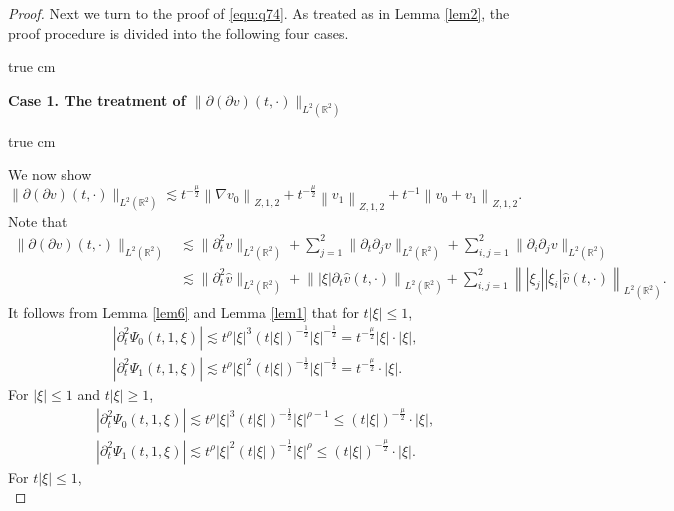 \documentclass[10pt,a4paper]{amsart}
\newcommand{\R}{\mathbb R}
\newcommand{\f}{\frac}
\newcommand{\p}{\partial}
\begin{document}
\begin{proof}
Next we turn to the proof of \eqref{equ:q74}. As treated as in  Lemma \ref{lem2}, the proof
procedure is divided into the following four cases.

 true cm

{\bf Case 1.  The treatment  of $\|\p(\p v)(t, \cdot)\|_{L^2(\R^2)}$ }

 true cm

We now show
\begin{equation}\label{equ:q78}
\|\p(\p v)(t, \cdot)\|_{L^2(\R^2)} \lesssim t^{-\f{\mu}{2}}\left\|\nabla v_0\right\|_{Z, 1, 2}
+t^{-\f{\mu}{2}}\left\|v_1\right\|_{Z, 1,2}+t^{-1}\left\|v_0+v_1\right\|_{Z, 1, 2}.
\end{equation}
Note that
\begin{equation}\label{equ:q78-1}
\begin{aligned}
\|\p(\p v)(t, \cdot)\|_{L^2(\R^2)} & \lesssim\|\p_t^2v\|_{L^2(\R^2)}+\sum_{j=1}^2\|\p_t\p_jv\|_{L^2(\R^2)}+\sum_{i,j=1}^2\|\p_i\p_jv\|_{L^2(\R^2)}\\
& \lesssim \|\p_t^2\hat{v}\|_{L^2(\R^2)}+\left\||\xi|\p_t\hat{v}(t, \cdot)\right\|_{L^2(\R^2)}+ \sum_{i,j=1}^2\left\||\xi_j||\xi_i|\hat{v}(t, \cdot)\right\|_{L^2(\R^2)}.
\end{aligned}
\end{equation}
It follows from Lemma \ref{lem6} and Lemma \ref{lem1} that for $t|\xi|\leq1$,
\begin{equation}\label{p-1}
\begin{aligned}
& \left|\p_t^2\Psi_0(t, 1,\xi)\right| \lesssim t^\rho|\xi|^3(t|\xi|)^{-\f{1}{2}}|\xi|^{-\f{1}{2}}= t^{-\frac{\mu}{2}}|\xi|\cdot|\xi|, \\
& \left|\p_t^2\Psi_1(t, 1, \xi)\right|  \lesssim t^\rho|\xi|^2(t|\xi|)^{-\f{1}{2}}|\xi|^{-\f{1}{2}}= t^{-\frac{\mu}{2}}\cdot|\xi|.
\end{aligned}
\end{equation}
For  $|\xi|\leq1$ and $t|\xi|\geq1$,
\begin{equation}\label{p-2}
\begin{aligned}
& \left|\p_t^2\Psi_0(t, 1,\xi)\right| \lesssim t^\rho|\xi|^3(t|\xi|)^{-\f{1}{2}}|\xi|^{\rho-1}\leq (t|\xi|)^{-\frac{\mu}{2}}\cdot|\xi|, \\
& \left|\p_t^2\Psi_1(t, 1, \xi)\right|  \lesssim t^\rho|\xi|^2(t|\xi|)^{-\f{1}{2}}|\xi|^{\rho}\leq (t|\xi|)^{-\frac{\mu}{2}}\cdot|\xi|.
\end{aligned}
\end{equation}
For $t|\xi|\leq1$,
\begin{equation}\label{p-3}

\end{equation}
\end{proof}
\end{document}
